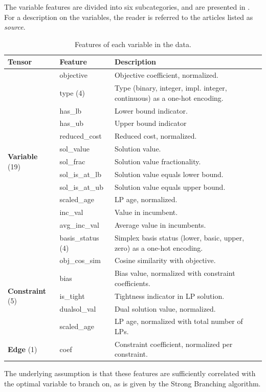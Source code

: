 The variable features are divided into six subcategories, and are presented in . For a description on the variables, the reader is referred to the articles listed as \textit{source}. 
%
\begin{table}[h]
	\centering
	\begin{tabular}{lll}
		\toprule
		  Tensor & Feature & Description \\ 
		  \toprule
		  \multirow{13}{2.5cm}{\textbf{Variable} (19)} & objective & Objective coefficient, normalized.  \\
		  & type (4) & Type (binary, integer, impl. integer, continuous) as a one-hot encoding. \\
		  & has\_lb & Lower bound indicator. \\
		  & has\_ub & Upper bound indicator \\
		  & reduced\_cost & Reduced cost, normalized. \\
		  & sol\_value & Solution value. \\
          & sol\_frac  & Solution value fractionality.\\
		  & sol\_is\_at\_lb & Solution value equals lower bound.\\
		  & sol\_is\_at\_ub & Solution value equals upper bound.\\
		  & scaled\_age & LP age, normalized. \\
          & inc\_val & Value in incumbent.\\
          & avg\_inc\_val & Average value in incumbents.\\
		  & basis\_status (4) & Simplex basis status (lower, basic, upper, zero) as a one-hot encoding.\\
		  \midrule
		  \multirow{5}{2.5cm}{\textbf{Constraint} (5)} & obj\_cos\_sim & Cosine similarity with objective. \\
		  & bias & Bias value, normalized with constraint coefficients. \\
		  & is\_tight & Tightness indicator in LP solution. \\
		  & dualsol\_val & Dual solution value, normalized. \\
		  & scaled\_age & LP age, normalized with total number of LPs. \\
		  \midrule
		  \multirow{1}{2.5cm}{\textbf{Edge} (1)} & coef & Constraint coefficient, normalized per constraint. \\
		\bottomrule
	\end{tabular}
	\caption{Features of each variable in the data. \cite{gasse2019exact}}\label{tab:feats}
\end{table}
%
The underlying assumption is that these features are sufficiently correlated with the optimal variable to branch on, as is given by the Strong Branching algorithm.



